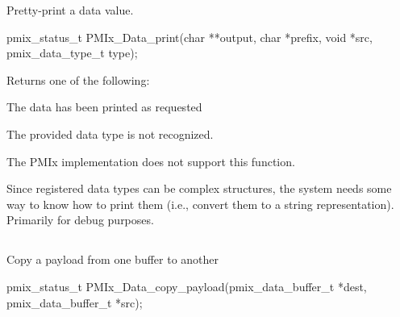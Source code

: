 \summary

Pretty-print a data value.

\format

\begin{signature}{2.0}
pmix_status_t
PMIx_Data_print(char **output, char *prefix,
\hspace*{16\sigspace}void *src, pmix_data_type_t type);
\end{signature}

\begin{arglist}
\end{arglist}

Returns one of the following:
\begin{constantdesc}
\item {} The data has been printed as requested
\item {} The provided data type is not recognized.
\item {} The \ac{PMIx} implementation does not support this function.
\end{constantdesc}

\descr

Since registered data types can be complex structures, the system needs some way to know how to print them (i.e., convert them to a string representation). Primarily for debug purposes.


\subsection{}

\summary

Copy a payload from one buffer to another

\format

\begin{signature}{2.0}
pmix_status_t
PMIx_Data_copy_payload(pmix_data_buffer_t *dest,
\hspace*{23\sigspace}pmix_data_buffer_t *src);
\end{signature}

